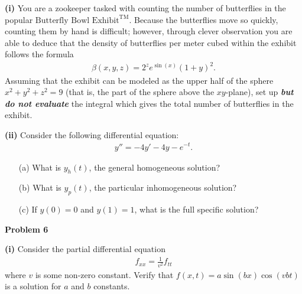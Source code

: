 \documentclass[12pt]{amsbook}
\begin{document}
\vspace{.25cm}

\textbf{(i)} You are a zookeeper tasked with counting the number of butterflies in the popular $\text{Butterfly Bowl Exhibit}^{\text{TM}}$. Because the butterflies move so quickly, counting them by hand is difficult; however, through clever observation you are able to deduce that the density of butterflies per meter cubed within the exhibit follows the formula
\begin{align*}
\beta(x,y,z) = 2^ze^{\sin(x)}(1+y)^2.
\end{align*}
Assuming that the exhibit can be modeled as the upper half of the sphere $x^2+y^2+z^2 = 9$ (that is, the part of the sphere above the $xy$-plane), set up \emph{\textbf{but do not evaluate}} the integral which gives the total number of butterflies in the exhibit.





\vspace{6cm}


\textbf{(ii)} Consider the following differential equation:
\begin{align*}
y'' = -4y' - 4y - e^{-t}.
\end{align*}
\begin{itemize}
\item[(a)] What is $y_h(t)$, the general homogeneous solution?
\item[(b)] What is $y_p(t)$, the particular inhomogeneous solution?
\item[(c)] If $y(0) = 0$ and $y(1) = 1$, what is the full specific solution?
\end{itemize}






\newpage

\textbf{Problem 6}

\vspace{.25cm}

\textbf{(i)} Consider the partial differential equation
\begin{align*}
f_{xx} = \frac{1}{v^2}f_{tt}
\end{align*}
where $v$ is some non-zero constant. Verify that $f(x,t) = a\sin(bx)\cos(vbt)$ is a solution for $a$ and $b$ constants.


\vspace{10cm}
\end{document}
